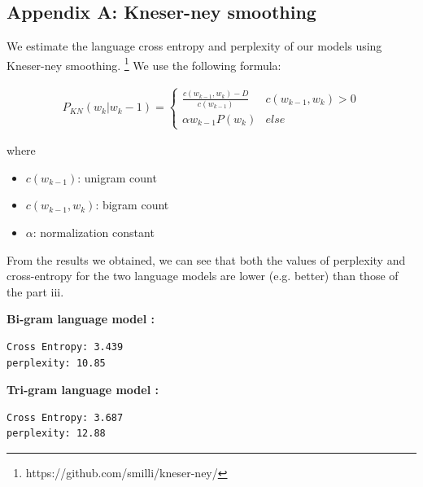 \documentclass[11pt]{article}
\begin{document}
\newpage
\subsection*{Appendix A: Kneser-ney smoothing} 
We estimate the language cross entropy and perplexity of our models using Kneser-ney smoothing.
\footnote{https://github.com/smilli/kneser-ney/} 
We use the following formula:

\begin{align*}
P_{KN}(w_k | w_k-1) =  \begin{cases}  \frac{c(w_{k-1},w_k)-D}{c(w_{k-1})} & c(w_{k-1},w_k) > 0 \\ \alpha w_{k-1} P(w_k) & else \end{cases}
\end{align*}

where 
\begin{itemize}
\item $c(w_{k-1})$: unigram count
\item $c(w_{k-1},w_k)$: bigram count
\item $\alpha$: normalization constant  
\end{itemize}


From the results we obtained, we can see that both the values of perplexity and cross-entropy for the two language models are lower (e.g. better) than those of the part iii.

\bigskip
\textbf{Bi-gram language model :}
\begin{verbatim}
Cross Entropy: 3.439
perplexity: 10.85
\end{verbatim}

\textbf{Tri-gram language model :}
\begin{verbatim}
Cross Entropy: 3.687
perplexity: 12.88
\end{verbatim}

 
 
\end{document}
